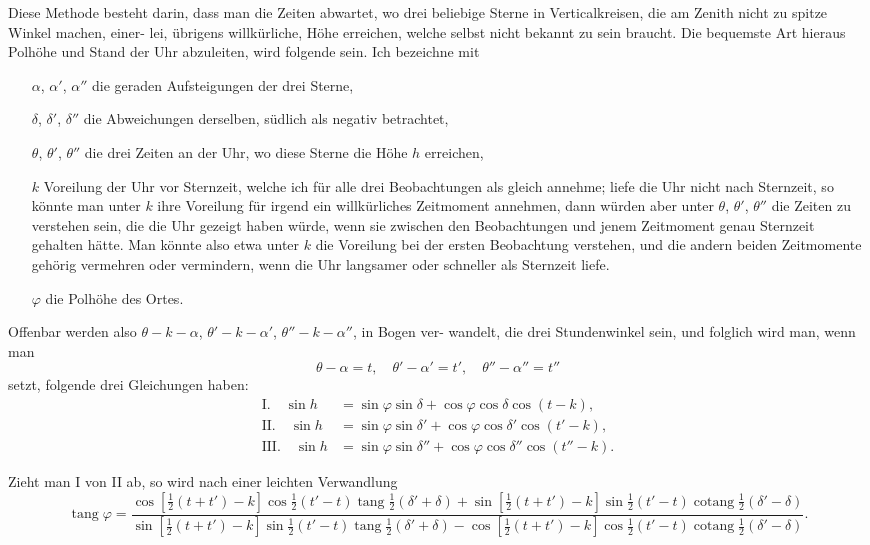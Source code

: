 \documentclass[12pt,a4paper]{article}
\DeclareMathOperator{\tang}{tang}
\DeclareMathOperator{\cotang}{cotang}
\begin{document}
Diese Methode besteht darin, dass man die Zeiten abwartet, wo drei beliebige
Sterne in Verticalkreisen, die am Zenith nicht zu spitze Winkel machen, einer-
lei, übrigens willkürliche, Höhe erreichen, welche selbst nicht bekannt zu sein
braucht. Die bequemste Art hieraus Polhöhe und Stand der Uhr abzuleiten,
wird folgende sein. Ich bezeichne mit
\begin{itemize}[leftmargin=2em, itemsep=0pt]
\item[$\alpha$, $\alpha'$, $\alpha''$] die geraden Aufsteigungen der drei Sterne,
\item[$\delta$, $\delta'$, $\delta''$] die Abweichungen derselben, südlich als negativ betrachtet,
\item[$\theta$, $\theta'$, $\theta''$] die drei Zeiten an der Uhr, wo diese Sterne die Höhe $h$ erreichen,
\item[$k$] Voreilung der Uhr vor Sternzeit, welche ich für alle drei Beobachtungen
als gleich annehme; liefe die Uhr nicht nach Sternzeit, so könnte man unter $k$
 ihre Voreilung für irgend ein willkürliches Zeitmoment annehmen, dann würden
aber unter $\theta$, $\theta'$, $\theta''$ die Zeiten zu verstehen sein, die die Uhr gezeigt haben würde,
wenn sie zwischen den Beobachtungen und jenem Zeitmoment genau Sternzeit
gehalten hätte. Man könnte also etwa unter $k$ die Voreilung bei der ersten
Beobachtung verstehen, und die andern beiden Zeitmomente gehörig vermehren
oder vermindern, wenn die Uhr langsamer oder schneller als Sternzeit liefe.
\item[$\varphi$] die Polhöhe des Ortes.
\end{itemize}

Offenbar werden also $\theta - k - \alpha$, $\theta' - k - \alpha'$, $\theta'' - k - \alpha''$, in Bogen ver-
wandelt, die drei Stundenwinkel sein, und folglich wird man, wenn man
\[
\theta - \alpha = t,\quad \theta' - \alpha' = t',\quad \theta'' - \alpha'' = t''
\]
setzt, folgende drei Gleichungen haben:
\begin{align*}
\text{I.}\quad \sin h &= \sin\varphi\sin\delta + \cos\varphi\cos\delta\cos(t-k),\\
\text{II.}\quad \sin h &= \sin\varphi\sin\delta' + \cos\varphi\cos\delta'\cos(t'-k),\\
\text{III.}\quad \sin h &= \sin\varphi\sin\delta'' + \cos\varphi\cos\delta''\cos(t''-k).
\end{align*}

Zieht man I von II ab, so wird nach einer leichten Verwandlung
\[
\tang\varphi = \frac{\cos[\frac{1}{2}(t+t')-k]\cos\frac{1}{2}(t'-t)\tang\frac{1}{2}(\delta'+\delta) + \sin[\frac{1}{2}(t+t')-k]\sin\frac{1}{2}(t'-t)\cotang\frac{1}{2}(\delta'-\delta)}{\sin[\frac{1}{2}(t+t')-k]\sin\frac{1}{2}(t'-t)\tang\frac{1}{2}(\delta'+\delta) - \cos[\frac{1}{2}(t+t')-k]\cos\frac{1}{2}(t'-t)\cotang\frac{1}{2}(\delta'-\delta)}.
\]
\end{document}
